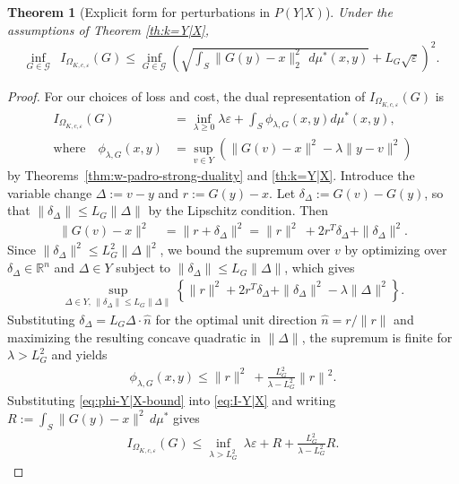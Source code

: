 \documentclass{article}
\newcommand{\R}{\mathbb{R}} %
\newcommand{\Okc}{\Omega_{K, c, \varepsilon}}
\newcommand{\phifix}{\phi_{\lambda, G}}
\newtheorem{theorem}{Theorem}[section]
\theoremstyle{definition}
\theoremstyle{remarksty}
\begin{document}
\begin{theorem}[Explicit form for perturbations in $P(Y|X)$]\label{th:explicit-p(Y|X)}
Under the assumptions of Theorem \ref{th:k=Y|X}, 
\begin{align*}
    \inf_{G \in \mathcal{G}} &I_{\Okc}(G) \leq \inf_{G \in \mathcal{G}} \left(\sqrt{\int_S \|G(y)-x\|^2_2\ \,d\mu_{}^*(x,y)} 
    + L_G\sqrt{\varepsilon} \right)^2.
\end{align*}
\end{theorem}
\begin{proof}
For our choices of loss and cost, the dual representation of $I_{\Okc}(G)$ is
\begin{align}
        I_{\Okc} (G) &= \inf_{\lambda \geq 0} \lambda \varepsilon + \int_{S} \phifix(x,y) d\mu^*(x,y), \label{eq:I-Y|X} \\
        \text{where} \quad \phifix(x,y) &= \sup_{v \in Y} (\|G(v)-x\|^2 -\lambda\|y-v\|^2)
    \end{align}
by Theorems~\ref{thm:w-padro-strong-duality} and \ref{th:k=Y|X}. Introduce the variable change $\Delta := v - y$ and $r := G(y) - x$. Let $\delta_\Delta := G(v) - G(y)$, so that $\|\delta_\Delta\| \leq L_G\|\Delta\|$ by the Lipschitz condition. Then
\begin{align*}
    \|G(v) - x\|^2\  
    &= \|r + \delta_\Delta\|^2  
    =  \|r\|^2\ 
    + 2 r^T \delta_\Delta 
    + \|\delta_\Delta\|^2.
\end{align*}
Since $\|\delta_\Delta\|^2 \leq L_G^2\|\Delta\|^2$, we bound the supremum over $v$ by 
optimizing over $\delta_\Delta \in \R^n$ and $\Delta \in Y$ subject to $\|\delta_\Delta\| \leq L_G\|\Delta\|$, which gives
\begin{align*}
    \sup_{\Delta \in Y,\, \|\delta_\Delta\| \leq L_G\|\Delta\|}\left\{ \|r\|^2  + 2r^T\!\delta_\Delta  + \|\delta_\Delta\|^2 - \lambda\|\Delta\|^2 \right\}.
\end{align*}
Substituting $\delta_\Delta = L_G \Delta \cdot \hat{n}$ for the optimal unit direction $\hat{n}=r/\|r\|$ and maximizing the resulting concave quadratic in $\|\Delta\|$, the supremum is finite for $\lambda > L_G^2$ and yields
\begin{align}\label{eq:phi-Y|X-bound}
    \phifix(x,y) \leq \|r\|^2\  + \frac{L_G^2}{\lambda - L_G^2} \left\| r\right\|^2.
\end{align}
Substituting \eqref{eq:phi-Y|X-bound} into \eqref{eq:I-Y|X} and writing $R := \int_S \|G(y)-x\|^2\, d\mu^*$ gives
\begin{align}\label{eq:bound-y|x-lambda}
    I_{\Okc}(G) \leq \inf_{\lambda > L_G^2}\ \lambda\varepsilon + R + \frac{L_G^2}{\lambda - L_G^2} R.

\end{align}
\end{proof}
\end{document}
